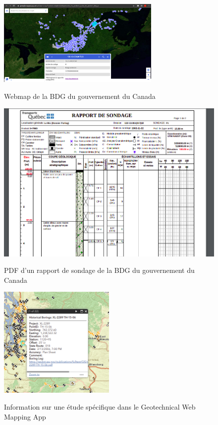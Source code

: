 \begin{figure}[t]
    \centering
    \includegraphics[width=0.7\textwidth]{images/Contexte/bdg.png}
    \caption{Webmap de la BDG du gouvernement du Canada }\cite{canadagov}
    \label{fig:BDG}
\end{figure}
\begin{figure}[t]
    \centering
    \includegraphics[width=1\textwidth]{images/Contexte/pdf_bdg.png}
    \caption{PDF d'un rapport de sondage de la BDG du gouvernement du Canada }\cite{linkpdfcanada}
    \label{fig:PDF_BDG}
\end{figure}
\begin{figure}[t]
    \centering
    \includegraphics[width=0.5\textwidth]{images/Contexte/wash.png}
    \caption{Information sur une étude spécifique dans le Geotechnical Web Mapping App }\cite{map1}
    \label{fig:wash}
\end{figure}

